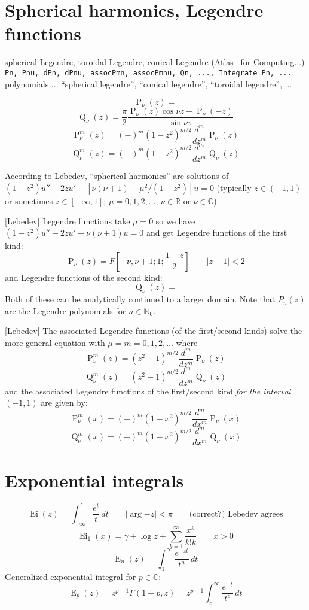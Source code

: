 \documentclass[10pt,dvipdfmx,letterpaper,twoside]{article}
\let\O=\operatorname
\newcommand{\RR}{{\mathbb{R}}}
\newcommand{\CC}{{\mathbb{C}}}
\newcommand{\NNo}{{\mathbb{N}_0}}
\let\gam=\gamma
\let\Gam=\Gamma
\begin{document}
\section{Spherical harmonics, Legendre functions}
spherical Legendre, toroidal Legendre, conical Legendre (Atlas~\cite{atlas:thompson} for Computing...)
{\tt Pn, Pnu, dPn, dPnu, assocPmn, assocPmnu, Qn, ..., Integrate\_Pn, ...} polynomials ...
``spherical legendre'', ``conical legendre'', ``toroidal legendre'', ...

\[ \O{P}_\nu(z) = \]
\[ \O{Q}_\nu(z) = \frac{\pi}{2} \frac{\O{P}_\nu(z) \cos\nu z - \O{P}_\nu(-z)}{\sin \nu\pi} \]
\[ \O{P}^m_\nu(z) = (-)^m(1-z^2)^{m/2} \frac{d^m}{dz^m} \O{P}_\nu(z) \]
\[ \O{Q}^m_\nu(z) = (-)^m(1-z^2)^{m/2} \frac{d^m}{dz^m} \O{Q}_\nu(z) \]

According to Lebedev, ``spherical harmonics'' are solutions of $(1-z^2)u'' - 2zu' + [\nu(\nu+1)-\mu^2/(1-z^2)]u = 0$
(typically $z\in(-1,1)$ or sometimes $z\in[-\infty,1]$; $\mu=0,1,2,\dots$; $\nu\in\RR$ or $\nu\in\CC$).

[Lebedev] Legendre functions take $\mu=0$ so we have $(1-z^2)u'' - 2zu' + \nu(\nu+1)u = 0$ and get
Legendre functions of the first kind:
\[ \O{P}_\nu(z) = F[-\nu,\nu+1; 1; \frac{1-z}{2}]  \qquad|z-1|<2 \]
and Legendre functions of the second kind:
\[ \O{Q}_\nu(z) = \]
Both of these can be analytically continued to a larger domain.  Note that $P_n(z)$ are the Legendre polynomials for $n\in\NNo$.

[Lebedev] The associated Legendre functions (of the first/second kinds) solve the more general equation with $\mu=m=0,1,2,\dots$
where
\[ \O{P}^m_\nu(z) = (z^2-1)^{m/2} \frac{d^m}{dz^m} \O{P}_\nu(z) \]
\[ \O{Q}^m_\nu(z) = (z^2-1)^{m/2} \frac{d^m}{dz^m} \O{Q}_\nu(z) \]
and the associated Legendre functions of the first/second kind {\em for the interval $(-1,1)$} are given by:
\[ \O{P}^m_\nu(x) = (-)^m(1-x^2)^{m/2} \frac{d^m}{dx^m} \O{P}_\nu(x) \]
\[ \O{Q}^m_\nu(x) = (-)^m(1-x^2)^{m/2} \frac{d^m}{dx^m} \O{Q}_\nu(x) \]



\section{Exponential integrals}

\[ \O{Ei}(z) = \int_{-\infty}^z \frac{e^t}{t}\,dt  \qquad|\arg {-z}|<\pi  \qquad\text{(correct?) Lebedev agrees}\]
\[ \O{Ei}_1(x) = \gam + \log z + \sum_{k=1}^\infty \frac{x^k}{k! k} \qquad x>0\]
\[ \O{E}_n(z) = \int_1^\infty\frac{e^{-zt}}{t^n}\,dt \]
Generalized exponential-integral for $p\in\CC$:
\[ \O{E}_p(z) = z^{p-1}\Gam(1-p,z) = z^{p-1}\int_z^\infty\frac{e^{-t}}{t^p}\,dt \]
\end{document}
